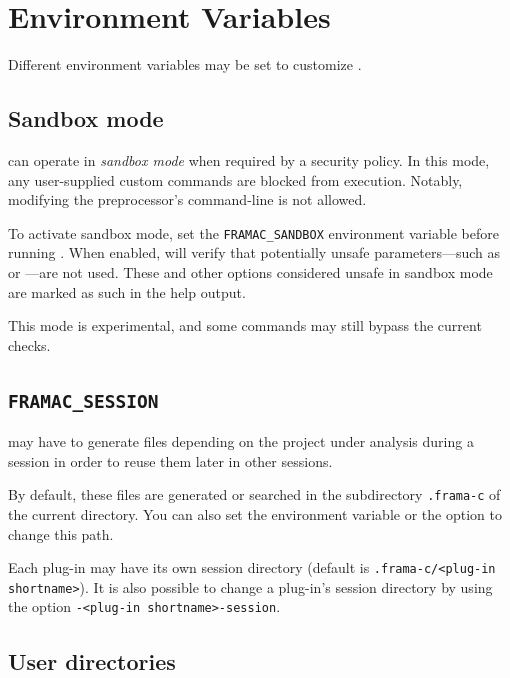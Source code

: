 \section{Environment Variables}\label{sec:env-variables}

Different environment variables may be set to customize \FramaC.

\subsection{Sandbox mode}\label{sec:sandbox-mode}

\FramaC can operate in \emph{sandbox mode} when required by a security policy.
In this mode, any user-supplied custom commands are blocked from execution.
Notably, modifying the preprocessor's command-line is not allowed.

To activate sandbox mode, set the \texttt{FRAMAC\_SANDBOX} environment variable
before running \FramaC. When enabled, \FramaC will verify that potentially
unsafe parameters---such as \texttt{} or
\texttt{}---are not used. These and
other options considered unsafe in sandbox mode are marked as such in the
\FramaC help output.

This mode is experimental, and some commands may still bypass the current
checks.

\subsection{\texttt{FRAMAC\_SESSION}}\label{sec:var-session}

\FramaC may have to generate files depending on the project under analysis
during a session in order to reuse them later in other sessions.

By default, these files are generated or searched in the subdirectory
\texttt{.frama-c} of the current directory. You can also set the environment
variable  or the option  to
change this path.

Each \FramaC plug-in may have its own session directory (default is
\texttt{.frama-c/<plug-in shortname>}). It is also possible to change
a plug-in's session directory by using the option \texttt{-<plug-in
  shortname>-session}.

\subsection{User directories}\label{sec:var-user-dirs}

